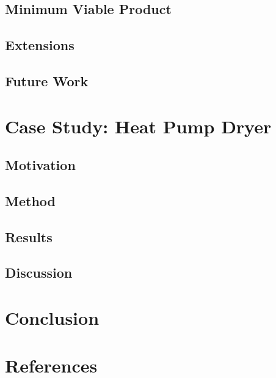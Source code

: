 \documentclass[12pt]{book}
\begin{document}
\section{Minimum Viable Product}

\section{Extensions}

\section{Future Work}

\chapter{Case Study: Heat Pump Dryer}

\section{Motivation}

\section{Method}

\section{Results}

\section{Discussion}

\chapter{Conclusion}

\chapter{References}

\end{document}
